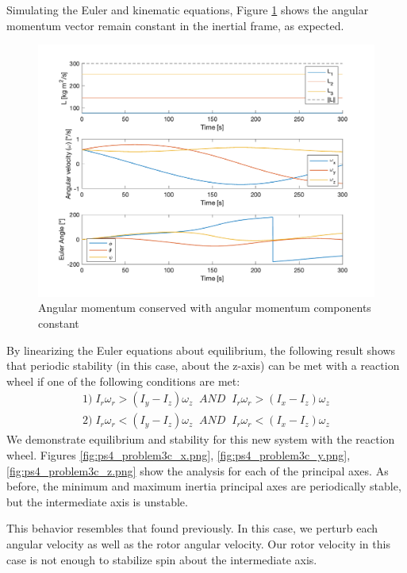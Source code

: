 

Simulating the Euler and kinematic equations, Figure \ref{fig:ps4_problem3b} shows the angular momentum vector remain constant in the inertial frame, as expected.

\begin{figure}[H]
\centering
\includegraphics[scale=0.6]{Images/ps4_problem3b.png}
\caption{Angular momentum conserved with angular momentum components constant}
\label{fig:ps4_problem3b}
\end{figure}

By linearizing the Euler equations about equilibrium, the following result shows that periodic stability (in this case, about the z-axis) can be met with a reaction wheel if one of the following conditions are met:
\begin{align*}
    1)\; I_r \omega_r > (I_y - I_z) \omega_z \;\; AND \;\; I_r \omega_r > (I_x - I_z) \omega_z \\
    2)\; I_r \omega_r < (I_y - I_z) \omega_z \;\; AND \;\; I_r \omega_r < (I_x - I_z) \omega_z
\end{align*}
We demonstrate equilibrium and stability for this new system with the reaction wheel. Figures \ref{fig:ps4_problem3c_x.png}, \ref{fig:ps4_problem3c_y.png}, \ref{fig:ps4_problem3c_z.png} show the analysis for each of the principal axes. As before, the minimum and maximum inertia principal axes are periodically stable, but the intermediate axis is unstable.

This behavior resembles that found previously. In this case, we perturb each angular velocity as well as the rotor angular velocity. Our rotor velocity in this case is not enough to stabilize spin about the intermediate axis.

